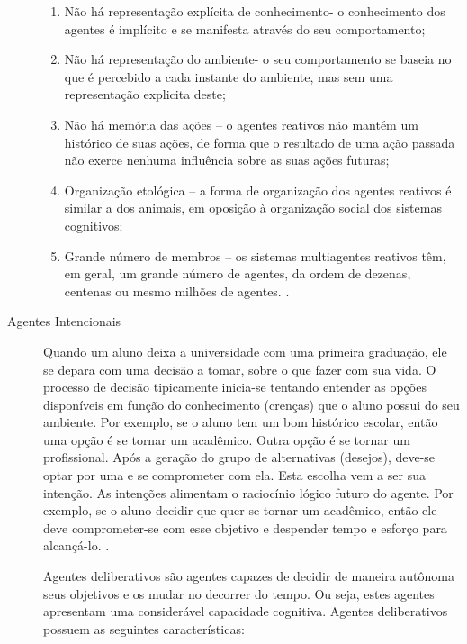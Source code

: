 \begin{description}
\begin{citacao}
\begin{enumerate}
	\item Não há representação explícita de conhecimento- o conhecimento dos agentes é implícito e se manifesta através do seu comportamento;

	\item Não há representação do ambiente- o seu comportamento se baseia no que é percebido a cada instante do ambiente, mas sem uma representação explicita deste; 

	\item Não há memória das ações – o agentes reativos não mantém um histórico de suas ações, de forma que o resultado de uma ação passada não exerce nenhuma influência sobre as suas ações futuras;


	\item Organização etológica – a forma de organização dos agentes reativos é similar a dos animais, em oposição à organização social dos sistemas cognitivos;

 	\item Grande número de membros – os sistemas multiagentes reativos têm, em geral, um grande número de agentes, da ordem de dezenas, centenas ou mesmo milhões de agentes.
 	\newline \cite[p. 12]{alvares1997}.

\end{enumerate}
\end{citacao}


\item [Agentes Intencionais]

Quando um aluno deixa a universidade com uma primeira graduação, ele se depara com uma decisão a tomar, sobre o que fazer com sua vida. O processo de decisão tipicamente inicia-se tentando entender as opções disponíveis em função do conhecimento (crenças) que o aluno possui do seu ambiente. Por exemplo, se o aluno tem um bom histórico escolar, então uma opção é se tornar um acadêmico. Outra opção é se tornar um profissional. Após a geração do grupo de alternativas (desejos), deve-se optar por uma e se comprometer com ela. Esta escolha vem a ser sua intenção. As intenções alimentam o raciocínio lógico futuro do agente. Por exemplo, se o aluno decidir que quer se tornar um acadêmico, então ele deve comprometer-se com esse objetivo e despender tempo e esforço para alcançá-lo. .

Agentes deliberativos são agentes capazes de decidir de maneira autônoma seus objetivos e os mudar no decorrer do tempo. Ou seja, estes agentes apresentam uma considerável capacidade cognitiva. Agentes deliberativos possuem as seguintes características:
\begin{citacao}
\begin{enumerate}


\end{enumerate}
\end{citacao}
\end{description}
